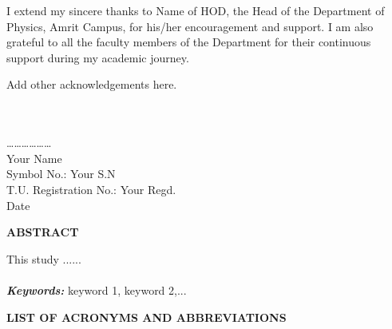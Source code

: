 I extend my sincere thanks to Name of HOD, the Head of the Department of Physics, Amrit Campus, for his/her encouragement and support. I am also grateful to all the faculty members of the Department for their continuous support during my academic journey.

Add other acknowledgements here.
\\
\\
\\
\begin{flushright}
\dots\dots\dots\dots\dots\dots\\
Your Name\\
Symbol No.: Your S.N\\
T.U. Registration No.: Your Regd.\\
Date
\end{flushright}
\newpage
{}
{}
\begin{center}
\Large\bf{ABSTRACT}
\end{center}
\vspace{2cm}


This study ...... \\\\
\textbf{\textit{Keywords:}}  keyword 1, keyword 2,...



\newpage
{}
{}
\begin{center}
\Large\bf {LIST OF ACRONYMS AND ABBREVIATIONS}
\end{center}
\vspace{1.5cm}

